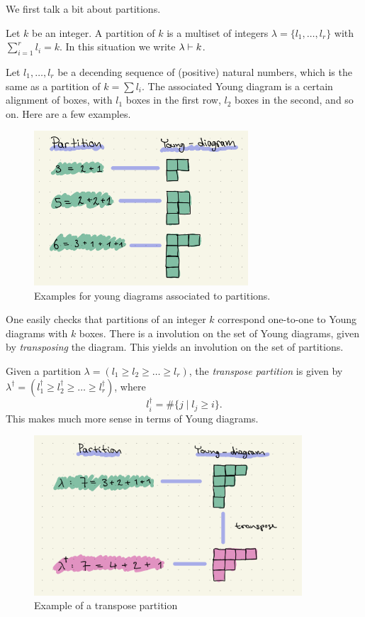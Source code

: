 \documentclass[../main.tex]{subfiles}
\begin{document}
We first talk a bit about partitions.
\begin{defi}[Partition]
    Let $k$ be an integer. A partition of $k$ is a multiset of integers
    $\lambda = \{l_1, \dots, l_r\}$ with $\sum_{i = 1}^r l_i = k$. In this 
    situation we write $\lambda \vdash k$.
\end{defi}
\begin{defi}
    Let $l_1, \dots, l_r$ be a decending sequence of (positive) natural numbers,
    which is the same as a partition of $k = \sum l_i$. 
    The associated Young diagram is a certain alignment of boxes, with
    $l_1$ boxes in the first row, $l_2$ boxes in the second, and so on. 
    Here are a few examples.
    \begin{figure}[h]
        \centering
        \includegraphics[width=8cm]{youngdiagram.jpeg}
        \caption{Examples for young diagrams associated to partitions.}
    \end{figure}
\end{defi}
One easily checks that partitions of an integer $k$ correspond one-to-one to
Young diagrams with $k$ boxes.
There is a involution on the set of Young diagrams, given by \emph{transposing}
the diagram. This yields an involution on the set of partitions.
\begin{defi}
    Given a partition $\lambda = (l_1 \geq l_2 \geq \dots \geq l_r)$, the 
    \emph{transpose partition} is given by $\lambda^\dagger = 
    (l^\dagger_1 \geq l^\dagger_2 \geq \dots \geq l^\dagger_r)$, where
    \begin{equation*}
        l^\dagger_i = \# \{j \mid l_j \geq i\}.
    \end{equation*}
    This makes much more sense in terms of Young diagrams.
    \begin{figure}[H]
        \centering
        \includegraphics[width=10cm]{transpose.jpeg}
        \caption{Example of a transpose partition}
    \end{figure}
\end{defi}
\end{document}
